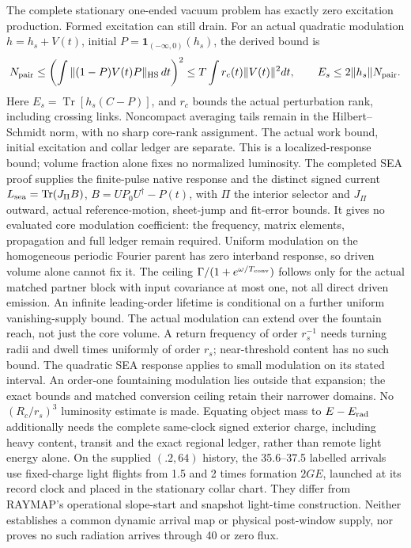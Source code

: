 \documentclass[10pt]{article}
\begin{document}
The complete stationary one-ended vacuum problem
has exactly zero excitation production. Formed
excitation can still drain. For an actual quadratic
modulation \(h=h_s+V(t)\), initial
\(P=\mathbf1_{(-\infty,0)}(h_s)\), the derived bound is
\[
 N_{\rm pair}\le
 \left(\int\|(1-P)V(t)P\|_{\rm HS}\,dt\right)^2
 \le T\int r_c(t)\|V(t)\|^2dt,\qquad
 E_s\le2\|h_s\|N_{\rm pair}.
\]
Here \(E_s=\operatorname{Tr}[h_s(C-P)]\), and \(r_c\)
bounds the actual perturbation rank, including crossing
links. Noncompact averaging tails remain in the
Hilbert--Schmidt norm, with no sharp core-rank assignment.
The actual work bound,
initial excitation and collar ledger are separate.
This is a localized-response bound; volume fraction
alone fixes no normalized luminosity. The completed
SEA proof supplies the finite-pulse native response
and the distinct signed current
\(L_{\rm sea}=\operatorname{Tr}(J_\Pi B)\),
\(B=UP_0U^\dagger-P(t)\), with \(\Pi\) the interior
selector and \(J_\Pi\) outward, actual reference-motion,
sheet-jump and fit-error bounds. It gives no evaluated
core modulation coefficient: the frequency, matrix
elements, propagation and full ledger remain required.
Uniform modulation on the homogeneous periodic Fourier
parent has zero interband response,
so driven volume alone cannot fix it. The ceiling
\(\Gamma/(1+e^{\omega/T_{\rm conv}})\) follows only
for the actual matched partner block with input
covariance at most one, not all direct driven emission.
An infinite leading-order lifetime is conditional on
a further uniform vanishing-supply bound.
The actual modulation can extend over the fountain reach,
not just the core volume. A return frequency of order
\(r_s^{-1}\) needs turning radii and dwell times uniformly
of order \(r_s\); near-threshold content has no such bound.
The quadratic SEA response applies to small modulation on
its stated interval. An order-one fountaining modulation
lies outside that expansion; the exact bounds and matched
conversion ceiling retain their narrower domains. No
\((R_c/r_s)^3\) luminosity estimate is made. Equating
object mass to \(E-E_{\rm rad}\) additionally needs the
complete same-clock signed exterior charge, including heavy
content, transit and the exact regional ledger, rather than
remote light energy alone.
On the supplied \((.2,64)\) history, the 35.6--37.5
labelled arrivals use fixed-charge light flights from
1.5 and 2 times formation \(2GE\), launched at its
record clock and placed in the stationary collar chart.
They differ from RAYMAP's operational slope-start and
snapshot light-time construction. Neither establishes
a common dynamic arrival map or physical post-window
supply, nor proves no such radiation arrives through
40 or zero flux.
\end{document}
